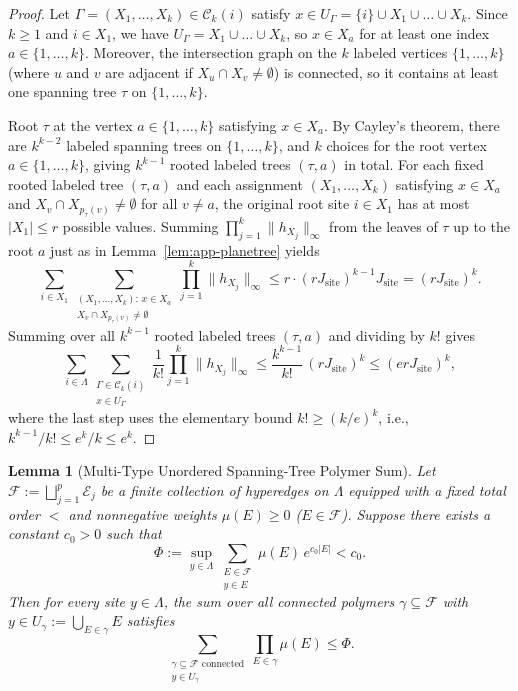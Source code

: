 \documentclass[11pt,a4paper]{article}
\numberwithin{equation}{section}
\theoremstyle{plain}
\newtheorem{lemma}[theorem]{Lemma}
\theoremstyle{definition}
\begin{document}
\begin{proof}
Let $\Gamma = (X_1,\dots,X_k)\in\mathcal{C}_k(i)$ satisfy $x\in U_\Gamma = \{i\}\cup X_1\cup\dots\cup X_k$. Since $k\ge 1$ and $i\in X_1$, we have $U_\Gamma = X_1\cup\dots\cup X_k$, so $x\in X_a$ for at least one index $a\in\{1,\dots,k\}$. Moreover, the intersection graph on the $k$ labeled vertices $\{1,\dots,k\}$ (where $u$ and $v$ are adjacent if $X_u\cap X_v\ne\emptyset$) is connected, so it contains at least one spanning tree $\tau$ on $\{1,\dots,k\}$.

Root $\tau$ at the vertex $a\in\{1,\dots,k\}$ satisfying $x\in X_a$. By Cayley's theorem, there are $k^{k-2}$ labeled spanning trees on $\{1,\dots,k\}$, and $k$ choices for the root vertex $a\in\{1,\dots,k\}$, giving $k^{k-1}$ rooted labeled trees $(\tau,a)$ in total. For each fixed rooted labeled tree $(\tau,a)$ and each assignment $(X_1,\dots,X_k)$ satisfying $x\in X_a$ and $X_v\cap X_{p_\tau(v)}\ne\emptyset$ for all $v\ne a$, the original root site $i\in X_1$ has at most $|X_1|\le r$ possible values. Summing $\prod_{j=1}^k \|h_{X_j}\|_\infty$ from the leaves of $\tau$ up to the root $a$ just as in Lemma~\ref{lem:app-planetree} yields
\[
  \sum_{i\in X_1}\sum_{\substack{(X_1,\dots,X_k):\, x\in X_a \\ X_v\cap X_{p_\tau(v)}\ne\emptyset}} \prod_{j=1}^k \|h_{X_j}\|_\infty
  \le r\cdot (r J_{\mathrm{site}})^{k-1} J_{\mathrm{site}} = (r J_{\mathrm{site}})^k.
\]
Summing over all $k^{k-1}$ rooted labeled trees $(\tau,a)$ and dividing by $k!$ gives
\[
  \sum_{i\in\Lambda}\sum_{\substack{\Gamma\in\mathcal{C}_k(i) \\ x\in U_\Gamma}} \frac{1}{k!}\prod_{j=1}^k \|h_{X_j}\|_\infty
  \le \frac{k^{k-1}}{k!}\,(r J_{\mathrm{site}})^k
  \le (er J_{\mathrm{site}})^k,
\]
where the last step uses the elementary bound $k! \ge (k/e)^k$, i.e., $k^{k-1}/k! \le e^k/k \le e^k$.
\end{proof}

\begin{lemma}[Multi-Type Unordered Spanning-Tree Polymer Sum]\label{lem:app-multitree}
Let $\mathcal{F} := \bigsqcup_{j=1}^p \mathcal{E}_j$ be a finite collection of hyperedges on $\Lambda$ equipped with a fixed total order $<$ and nonnegative weights $\mu(E) \ge 0$ ($E\in\mathcal{F}$). Suppose there exists a constant $c_0 > 0$ such that
\begin{equation}\label{eq:app-pin}
  \Phi := \sup_{y\in\Lambda}\sum_{\substack{E\in\mathcal{F} \\ y\in E}} \mu(E)\,e^{c_0|E|} < c_0.
\end{equation}
Then for every site $y\in\Lambda$, the sum over all connected polymers $\gamma\subseteq\mathcal{F}$ with $y\in U_\gamma := \bigcup_{E\in\gamma} E$ satisfies
\begin{equation}\label{eq:app-multitree}
  \sum_{\substack{\gamma\subseteq\mathcal{F}\text{ connected} \\ y\in U_\gamma}} \prod_{E\in\gamma} \mu(E)
  \le \Phi.
\end{equation}
\end{lemma}
\end{document}
